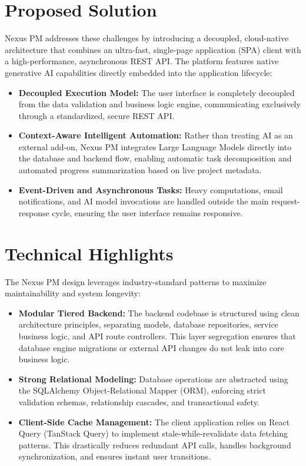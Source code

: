 \section{Proposed Solution}
Nexus PM addresses these challenges by introducing a decoupled, cloud-native architecture that combines an ultra-fast, single-page application (SPA) client with a high-performance, asynchronous REST API. The platform features native generative AI capabilities directly embedded into the application lifecycle:
\begin{itemize}
    \item \textbf{Decoupled Execution Model:} The user interface is completely decoupled from the data validation and business logic engine, communicating exclusively through a standardized, secure REST API.
    \item \textbf{Context-Aware Intelligent Automation:} Rather than treating AI as an external add-on, Nexus PM integrates Large Language Models directly into the database and backend flow, enabling automatic task decomposition and automated progress summarization based on live project metadata.
    \item \textbf{Event-Driven and Asynchronous Tasks:} Heavy computations, email notifications, and AI model invocations are handled outside the main request-response cycle, ensuring the user interface remains responsive.
\end{itemize}

\section{Technical Highlights}
The Nexus PM design leverages industry-standard patterns to maximize maintainability and system longevity:
\begin{itemize}
    \item \textbf{Modular Tiered Backend:} The backend codebase is structured using clean architecture principles, separating models, database repositories, service business logic, and API route controllers. This layer segregation ensures that database engine migrations or external API changes do not leak into core business logic.
    \item \textbf{Strong Relational Modeling:} Database operations are abstracted using the SQLAlchemy Object-Relational Mapper (ORM), enforcing strict validation schemas, relationship cascades, and transactional safety.
    \item \textbf{Client-Side Cache Management:} The client application relies on React Query (TanStack Query) to implement stale-while-revalidate data fetching patterns. This drastically reduces redundant API calls, handles background synchronization, and ensures instant user transitions.
\end{itemize}

